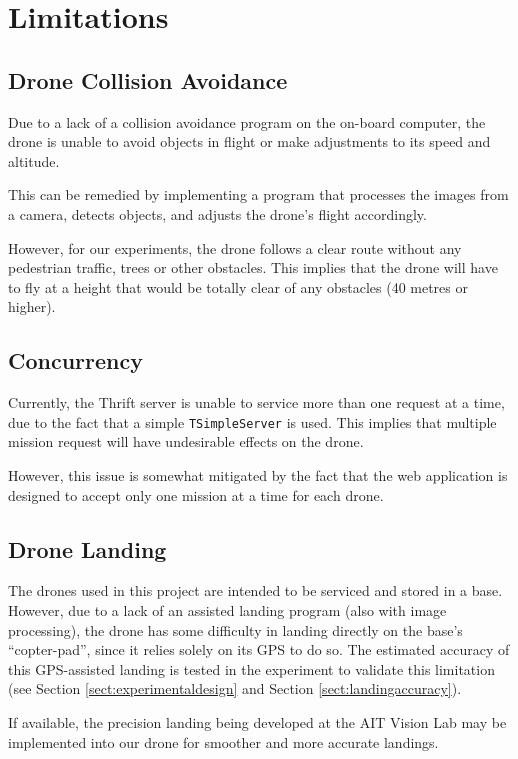 \newpage
\section{Limitations}\label{sect:limit}
\subsection{Drone Collision Avoidance}
Due to a lack of a collision avoidance program on the on-board computer, the drone is unable to avoid objects in flight or make adjustments to its speed and altitude. 

This can be remedied by implementing a program that processes the images from a camera, detects objects, and adjusts the drone\textquotesingle's flight accordingly. 

However, for our experiments, the drone follows a clear route without any pedestrian traffic, trees or other obstacles. This implies that the drone will have to fly at a height that would be totally clear of any obstacles (40 metres or higher). 

\subsection{Concurrency}\label{subsect:concurrency}
Currently, the Thrift server is unable to service more than one request at a time, due to the fact that a simple \texttt{TSimpleServer} is used. This implies that multiple mission request will have undesirable effects on the drone.

However, this issue is somewhat mitigated by the fact that the web application is designed to accept only one mission at a time for each drone.

\subsection{Drone Landing}\label{subsect:dronelanding}
The drones used in this project are intended to be serviced and stored in a base. However, due to a lack of an assisted landing program (also with image processing), the drone has some difficulty in landing directly on the base’s “copter-pad”, since it relies solely on its GPS to do so. The estimated accuracy of this GPS-assisted landing is tested in the experiment to validate this limitation (see Section \ref{sect:experimentaldesign} and Section \ref{sect:landingaccuracy}).

If available, the precision landing being developed at the AIT Vision Lab may be implemented into our drone for smoother and more accurate landings.

